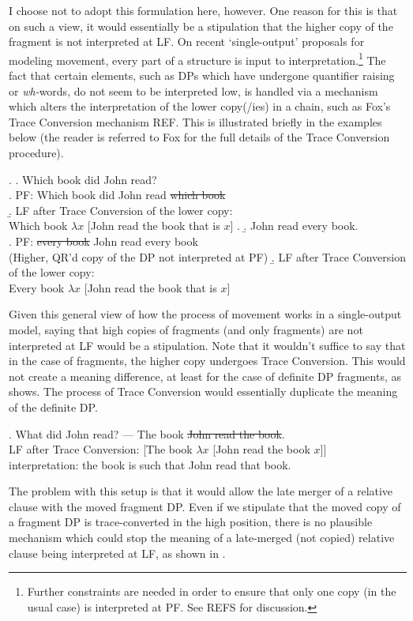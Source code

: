 \documentclass[11pt,letterpaper]{article}
\newcommand{\el}[1]{\sout{#1}}
\begin{document}
I choose not to adopt this formulation here, however.
One reason for this is that on such a view, it would essentially be a stipulation that the higher copy of the fragment is not interpreted at LF.
On recent `single-output' proposals for modeling movement, every part of a structure is input to interpretation.\footnote{Further constraints are needed in order to ensure that only one copy (in the usual case) is interpreted at PF.
See REFS %
for discussion.} 
The fact that certain elements, such as DPs which have undergone quantifier raising or {\it wh-}words, do not seem to be interpreted low, is handled via a mechanism which alters the interpretation of the lower copy(/ies) in a chain, such as Fox's Trace Conversion mechanism REF. %
This is illustrated briefly in the examples below (the reader is referred to Fox for the full details of the Trace Conversion procedure).

\ex. 	\a. Which book did John read?\\
		\a. PF: Which book did John read \sout{which book}\\
		\b. LF after Trace Conversion of the lower copy:\\
			Which book $\lambda x$ [John read the book that is $x$]
		\z. 
	\b. John read every book.\\
		\a. PF: \sout{every book} John read every book\\
		(Higher, QR'd copy of the DP not interpreted at PF)
		\b. LF after Trace Conversion of the lower copy:\\
			Every book $\lambda x$ [John read the book that is $x$]

Given this general view of how the process of movement works in a single-output model, saying that high copies of fragments (and only fragments) are not interpreted at LF would be a stipulation.
Note that it wouldn't suffice to say that in the case of fragments, the higher copy undergoes Trace Conversion.
This would not create a meaning difference, at least for the case of definite DP fragments, as \Next shows.
The process of Trace Conversion would essentially duplicate the meaning of the definite DP.

\ex. 	What did John read? --- The book \el{John read the book}.\\
	LF after Trace Conversion: [The book $\lambda x$ [John read the book $x$]]\\
	interpretation: the book is such that John read that book.

The problem with this setup is that it would allow the late merger of a relative clause with the moved fragment DP.
Even if we stipulate that the moved copy of a fragment DP is trace-converted in the high position, there is no plausible mechanism which could stop the meaning of a late-merged (not copied) relative clause being interpreted at LF, as shown in \Next.
\end{document}
